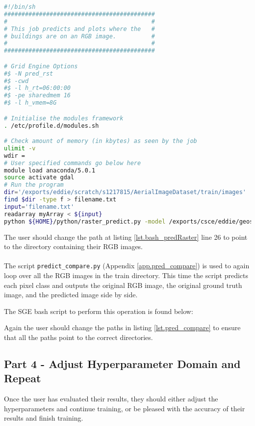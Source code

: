 \begin{lstlisting}[language=bash, caption = {Bash script required to submit the \texttt{raster\_predict.py} script}, label={lst.bash_predRaster}]
#!/bin/sh
###########################################
#                                         #
# This job predicts and plots where the   #
# buildings are on an RGB image.          #
#                                         #
###########################################

# Grid Engine Options
#$ -N pred_rst
#$ -cwd
#$ -l h_rt=06:00:00
#$ -pe sharedmem 16
#$ -l h_vmem=8G

# Initialise the modules framework
. /etc/profile.d/modules.sh

# Check amount of memory (in kbytes) as seen by the job
ulimit -v
wdir = 
# User specified commands go below here
module load anaconda/5.0.1
source activate gdal
# Run the program
dir='/exports/eddie/scratch/s1217815/AerialImageDataset/train/images'
find $dir -type f > filename.txt
input='filename.txt'
readarray myArray < ${input}
python ${HOME}/python/raster_predict.py -model /exports/csce/eddie/geos/groups/geos_cnn_imgclass/data/saved_models/model_inria_batch2_lr0.01_arch16_epochs100.pt -inpfile ${myArray[$SGE_TASK_ID-1]}
\end{lstlisting}
The user should change the path at listing \ref{lst.bash_predRaster} line 26 to point to the directory containing their RGB images.
\paragraph{}
The script \texttt{predict\_compare.py} (Appendix \ref{app.pred_compare}) is used to again loop over all the RGB images in the train directory. This time the script predicts each pixel class and outputs the original RGB image, the original ground truth image, and the predicted image side by side. 
\par
The SGE bash script to perform this operation is found below:

Again the user should change the paths in listing \ref{lst.pred_compare} to ensure that all the paths point to the correct directories. 
\subsection*{Part 4 - Adjust Hyperparameter Domain and Repeat}
Once the user has evaluated their results, they should either adjust the hyperparameters and continue training, or be pleased with the accuracy of their results and finish training. 
